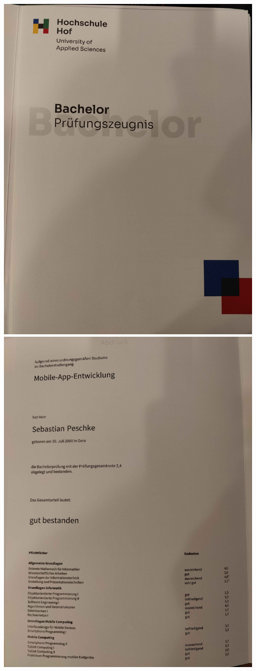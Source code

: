 \documentclass[
    10pt, %
]{FreemanCV}
\begin{document}
    \newpage
    \includegraphics[page=1,scale=0.17]{./assets/B_Zeugnis04}
    \newpage
    \includegraphics[page=2,scale=0.17]{./assets/B_Zeugnis03}
\end{document}
